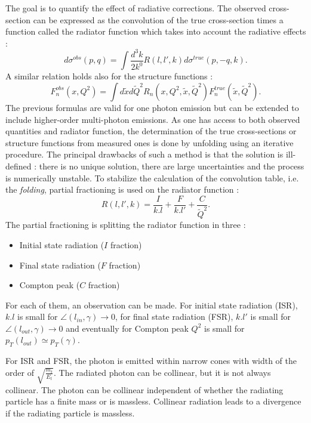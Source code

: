 The goal is to quantify the effect of radiative corrections. The observed cross-section can be expressed as the convolution of the true cross-section times a function called the radiator function which takes into account the radiative effects :
%
\begin{equation}
  d\sigma^{obs}(p,q) = \int \frac{d^{3}k}{2k^{0}}R(l,l',k)d\sigma^{true}(p,-q,k).
\end{equation}
%
A similar relation holds also for the structure functions :
%
\begin{equation}
  F_{n}^{obs}(x,Q^{2}) = \int d\tilde{x}d\tilde{Q}^{2}R_{n}(x,Q^{2},\tilde{x},\tilde{Q}^{2})F_{n}^{true}(\tilde{x},\tilde{Q}^{2}).
\end{equation}
%
The previous formulas are valid for one photon emission but can be extended to include higher-order multi-photon emissions. As one has access to both observed quantities and radiator function, the determination of the true cross-sections or structure functions from measured ones is done by unfolding using an iterative procedure. The principal drawbacks of such a method is that the solution is ill-defined : there is no unique solution, there are large uncertainties and the process is numerically unstable. To stabilize the calculation of the convolution table, i.e. the \textit{folding}, partial fractioning is used on the radiator function :
%
\begin{equation}
  R(l,l',k) = \frac{I}{k.l}+\frac{F}{k.l'}+\frac{C}{\tilde{Q}^{2}}.
\end{equation}
%
The partial fractioning is splitting the radiator function in three :
\begin{itemize}
\item Initial state radiation ($I$ fraction)
\item Final state radiation ($F$ fraction)
\item Compton peak ($C$ fraction)
\end{itemize}

For each of them, an observation can be made. For initial state radiation (ISR), $k.l$ is small for
$\angle (l_{in},\gamma) \rightarrow 0$, for final state radiation (FSR), $k.l'$ is small for
$\angle (l_{out},\gamma) \rightarrow 0$ and eventually for Compton peak $Q^{2}$ is small for
$p_{T}(l_{out}) \simeq p_{T}(\gamma)$.

For ISR and FSR, the photon is emitted within narrow cones with width of the order of $\sqrt{\frac{m_{t}}{E_{t}}}$. The radiated photon can be collinear, but it is not always collinear.
The photon can be collinear independent of whether the radiating particle has a finite mass or is massless. Collinear radiation leads to a divergence if the radiating particle is massless.

